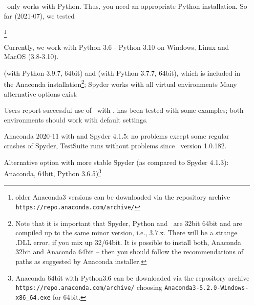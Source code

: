 \codeName\ only works with Python. Thus, you need an appropriate Python installation.
So far (2021-07), we tested
\bi
  \item {}\footnote{older Anaconda3 versions can be downloaded via the repository archive \texttt{https://repo.anaconda.com/archive/}}
  \item Currently, we work with Python 3.6 - Python 3.10  on Windows, Linux and MacOS (3.8-3.10).
  \item {} (with Python 3.9.7, 64bit) and  (with Python 3.7.7, 64bit), which is included in the Anaconda installation\footnote{Note that it is important that Spyder, Python and \codeName\  are  32bit  64bit and are compiled up to the same minor version, i.e., 3.7.x. There will be a strange .DLL error, if you mix up 32/64bit. It is possible to install both, Anaconda 32bit and Anaconda 64bit -- then you should follow the recommendations of paths as suggested by Anaconda installer.}; Spyder works with all virtual environments
\ei
Many alternative options exist:
\bi
  \item Users report successful use of \codeName\ with .  has been tested with some examples; both environments should work with default settings.
  \item Anaconda 2020-11 with  and Spyder 4.1.5: no problems except some regular crashes of Spyder, TestSuite runs without problems since \codeName\ version 1.0.182.
  \item Alternative option with more stable Spyder (as compared to Spyder 4.1.3): Anaconda, 64bit, Python 3.6.5)\footnote{Anaconda 64bit with Python3.6 can be downloaded via the repository archive \texttt{https://repo.anaconda.com/archive/} choosing \texttt{Anaconda3-5.2.0-Windows-x86\_64.exe} for 64bit.}
